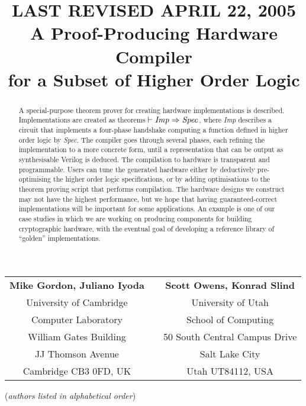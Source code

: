 \documentclass{llncs}
\title{{\tiny LAST REVISED APRIL 22, 2005}\\
       A Proof-Producing Hardware Compiler\\
       for a Subset of Higher Order Logic}
\author{}
\institute{}
\begin{document}
\maketitle

\vspace*{-8mm}

\begin{center}
\begin{tabular}{ccc}
{\bf Mike Gordon, Juliano Iyoda} &\hspace*{5mm}& {\bf Scott Owens, Konrad Slind}\\
University of Cambridge          &\hspace*{5mm}& University of Utah\\
Computer Laboratory              &\hspace*{5mm}& School of Computing\\
William Gates Building           &\hspace*{5mm}& 50 South Central Campus Drive\\
JJ Thomson Avenue                &\hspace*{5mm}& Salt Lake City\\
Cambridge CB3 0FD, UK            &\hspace*{5mm}& Utah UT84112, USA
\end{tabular}


\vspace*{2mm}

({\it{authors listed in alphabetical order\/}})
\end{center}

\vspace*{-5mm}

\thispagestyle{empty}

\begin{abstract}
A special-purpose theorem prover for creating hardware implementations
is described.  Implementations are created as theorems $\vdash
{\it{Imp}}\Rightarrow{\it{Spec}}$, where {\it{Imp}} describes a
circuit that implements a four-phase handshake computing a function
defined in higher order logic by {\it{Spec}}.  The compiler goes
through several phases, each refining the implementation to a more
concrete form, until a representation that can be output as
synthesisable Verilog is deduced.  The compilation to hardware is
transparent and programmable. Users can tune the generated hardware
either by deductively pre-optimising the higher order logic
specifications, or by adding optimisations to the theorem proving
script that performs compilation.  The hardware designs we construct
may not have the highest performance, but we hope that having
guaranteed-correct implementations will be important for some applications.
An example is one of our case studies in which we are working on
producing components for building cryptographic hardware, with
the eventual goal of developing a reference library of ``golden''
implementations.


\end{abstract}
\end{document}

